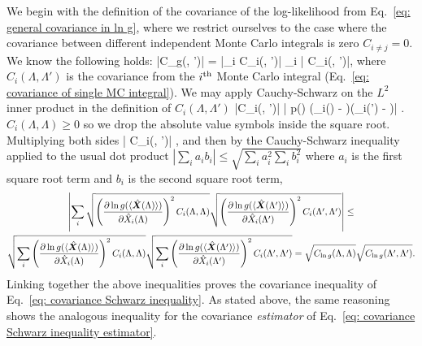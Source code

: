 \documentclass[%
 reprint,
 amsmath,amssymb,
 aps,nofootinbib,nobibnotes,onecolumn,prd
]{revtex4-2}
\begin{document}
We begin with the definition of the covariance of the log-likelihood from Eq.~\ref{eq: general covariance in ln g}, where we restrict ourselves to the case where the covariance between different independent Monte Carlo integrals is zero $C_{i\neq j} = 0$. We know the following holds:
\beq
|C_{\ln g}(\Lambda, \Lambda')| = \left|\sum_{i}  C_{i}(\Lambda, \Lambda')\right| \le \sum_{i} \left| C_{i}(\Lambda, \Lambda')\right|,
\eeq
where $C_i(\Lambda, \Lambda')$ is the covariance from the $i^{\rm th}$ Monte Carlo integral (Eq.~\ref{eq: covariance of single MC integral}). We may apply Cauchy-Schwarz on the $L^2$ inner product in the definition of $C_i(\Lambda, \Lambda')$
\beq
|C_{i}(\Lambda, \Lambda')| \equiv \left | p() \left(_i(\Lambda) - \right)\left(_i(\Lambda') - \right)\right| \le {}.
\eeq
$C_i(\Lambda, \Lambda) \ge 0$ so we drop the absolute value symbols inside the square root.
Multiplying both sides
\beq
\left| C_{i}(\Lambda, \Lambda')\right| \le {},
\eeq
and then by the Cauchy-Schwarz inequality applied to the usual dot product $|\sum_i a_i b_i| \leq \sqrt{\sum_i a_i^2\sum_i b_i^2}$ where $a_i$ is the first square root term and $b_i$ is the second square root term, 
\begin{multline}
\left|\sum_i\sqrt{\left(\frac{\partial\ln g(\langle \hat{\bm X}(\Lambda)\rangle)}{\partial\hat{X}_i(\Lambda)}\right)^2C_i(\Lambda, \Lambda)}\sqrt{\left(\frac{\partial\ln g(\langle \hat{\bm X}(\Lambda')\rangle)}{\partial\hat{X}_i(\Lambda')}\right)^2C_i(\Lambda', \Lambda')} \right| \le \\
\sqrt{\sum_i\left(\frac{\partial\ln g(\langle \hat{\bm X}(\Lambda)\rangle)}{\partial\hat{X}_i(\Lambda)}\right)^2C_i(\Lambda, \Lambda)}
\sqrt{\sum_i\left(\frac{\partial\ln g(\langle \hat{\bm X}(\Lambda')\rangle)}{\partial\hat{X}_i(\Lambda')}\right)^2C_i(\Lambda', \Lambda')} = \sqrt{C_{\ln g}(\Lambda, \Lambda)} \sqrt{C_{\ln g}(\Lambda', \Lambda')}.
\end{multline}
Linking together the above inequalities proves the covariance inequality of Eq.~\ref{eq: covariance Schwarz inequality}. As stated above, the same reasoning shows the analogous inequality for the covariance \textit{estimator} of Eq.~\ref{eq: covariance Schwarz inequality estimator}.





\end{document}
